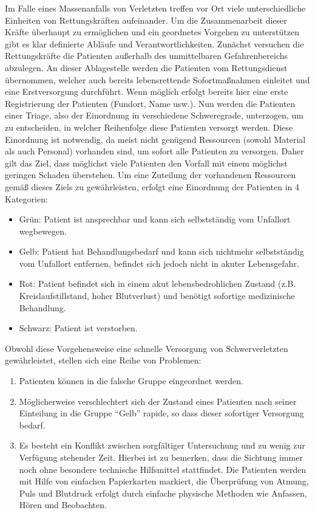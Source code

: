 Im Falle eines Massenanfalls von Verletzten treffen vor Ort viele unterschiedliche Einheiten von
Rettungskräften aufeinander. Um die Zusammenarbeit dieser Kräfte überhaupt zu ermöglichen und ein
geordnetes Vorgehen zu unterstützen gibt es klar definierte Abläufe und Verantwortlichkeiten. Zunächst
versuchen die Rettungskräfte die Patienten außerhalb des unmittelbaren Gefahrenbereichs abzulegen.
An dieser Ablagestelle werden die Patienten vom Rettungsdienst übernommen, welcher auch bereits
lebensrettende Sofortmaßnahmen einleitet und eine Erstversorgung durchführt. Wenn möglich erfolgt
bereits hier eine erste Registrierung der Patienten (Fundort, Name usw.).
Nun werden die Patienten einer Triage, also der Einordnung in verschiedene Schweregrade,
unterzogen, um zu entscheiden, in welcher Reihenfolge diese Patienten versorgt werden.
Diese Einordnung ist notwendig, da meist nicht genügend Ressourcen (sowohl Material als auch
Personal) vorhanden sind, um sofort alle Patienten zu versorgen. Daher gilt das Ziel, dass möglichst
viele Patienten den Vorfall mit einem möglichst geringen Schaden überstehen. Um eine Zuteilung der
vorhandenen Ressourcen gemäß dieses Ziels zu gewährleisten, erfolgt eine Einordnung der Patienten in
4 Kategorien:

\begin{itemize}
    \item{Grün:} Patient ist ansprechbar und kann sich selbstständig vom Unfallort wegbewegen.
    \item{Gelb:} Patient hat Behandlungsbedarf und kann sich nichtmehr selbstständig vom Unfallort entfernen, 
                 befindet sich jedoch nicht in akuter Lebensgefahr.
    \item{Rot:}  Patient befindet sich in einem akut lebensbedrohlichen Zustand (z.B. Kreislaufstillstand, hoher
                 Blutverlust) und benötigt sofortige medizinische Behandlung.
    \item{Schwarz:} Patient ist verstorben.
\end{itemize}

Obwohl diese Vorgehensweise eine schnelle Versorgung von Schwerverletzten gewährleistet, stellen
sich eine Reihe von Problemen:

\begin{enumerate}
    \item Patienten können in die falsche Gruppe eingeordnet werden.
    \item Möglicherweise verschlechtert sich der Zustand eines Patienten nach seiner Einteilung in die Gruppe
          "`Gelb"' rapide, so dass dieser sofortiger Versorgung bedarf.
    \item Es besteht ein Konflikt zwischen sorgfältiger Untersuchung und zu wenig zur Verfügung stehender
          Zeit. Hierbei ist zu bemerken, dass die Sichtung immer noch ohne besondere technische Hilfsmittel
          stattfindet. Die Patienten werden mit Hilfe von einfachen Papierkarten markiert, die Überprüfung von
          Atmung, Puls und Blutdruck erfolgt durch einfache physische Methoden wie Anfassen, Hören und
          Beobachten.
\end{enumerate}

